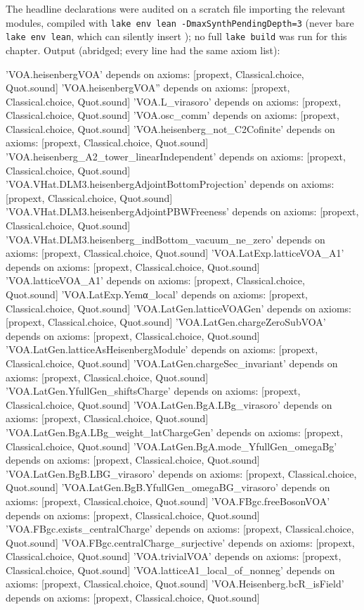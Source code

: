 The headline declarations were audited on a scratch file importing the relevant modules, compiled with
\texttt{lake env lean -DmaxSynthPendingDepth=3} (never bare \texttt{lake env lean}, which can silently insert
); no full \texttt{lake build} was run for this chapter. Output (abridged; every line had the same axiom
list):
\begin{plaincode}
'VOA.heisenbergVOA' depends on axioms: [propext, Classical.choice, Quot.sound]
'VOA.heisenbergVOA'' depends on axioms: [propext, Classical.choice, Quot.sound]
'VOA.L_virasoro' depends on axioms: [propext, Classical.choice, Quot.sound]
'VOA.osc_comm' depends on axioms: [propext, Classical.choice, Quot.sound]
'VOA.heisenberg_not_C2Cofinite' depends on axioms: [propext, Classical.choice, Quot.sound]
'VOA.heisenberg_A2_tower_linearIndependent' depends on axioms: [propext, Classical.choice, Quot.sound]
'VOA.VHat.DLM3.heisenbergAdjointBottomProjection' depends on axioms: [propext, Classical.choice, Quot.sound]
'VOA.VHat.DLM3.heisenbergAdjointPBWFreeness' depends on axioms: [propext, Classical.choice, Quot.sound]
'VOA.VHat.DLM3.heisenberg_indBottom_vacuum_ne_zero' depends on axioms: [propext, Classical.choice, Quot.sound]
'VOA.LatExp.latticeVOA_A1' depends on axioms: [propext, Classical.choice, Quot.sound]
'VOA.latticeVOA_A1' depends on axioms: [propext, Classical.choice, Quot.sound]
'VOA.LatExp.Yemα_local' depends on axioms: [propext, Classical.choice, Quot.sound]
'VOA.LatGen.latticeVOAGen' depends on axioms: [propext, Classical.choice, Quot.sound]
'VOA.LatGen.chargeZeroSubVOA' depends on axioms: [propext, Classical.choice, Quot.sound]
'VOA.LatGen.latticeAsHeisenbergModule' depends on axioms: [propext, Classical.choice, Quot.sound]
'VOA.LatGen.chargeSec_invariant' depends on axioms: [propext, Classical.choice, Quot.sound]
'VOA.LatGen.YfullGen_shiftsCharge' depends on axioms: [propext, Classical.choice, Quot.sound]
'VOA.LatGen.BgA.LBg_virasoro' depends on axioms: [propext, Classical.choice, Quot.sound]
'VOA.LatGen.BgA.LBg_weight_latChargeGen' depends on axioms: [propext, Classical.choice, Quot.sound]
'VOA.LatGen.BgA.mode_YfullGen_omegaBg' depends on axioms: [propext, Classical.choice, Quot.sound]
'VOA.LatGen.BgB.LBG_virasoro' depends on axioms: [propext, Classical.choice, Quot.sound]
'VOA.LatGen.BgB.YfullGen_omegaBG_virasoro' depends on axioms: [propext, Classical.choice, Quot.sound]
'VOA.FBgc.freeBosonVOA' depends on axioms: [propext, Classical.choice, Quot.sound]
'VOA.FBgc.exists_centralCharge' depends on axioms: [propext, Classical.choice, Quot.sound]
'VOA.FBgc.centralCharge_surjective' depends on axioms: [propext, Classical.choice, Quot.sound]
'VOA.trivialVOA' depends on axioms: [propext, Classical.choice, Quot.sound]
'VOA.latticeA1_local_of_nonneg' depends on axioms: [propext, Classical.choice, Quot.sound]
'VOA.Heisenberg.bcR_isField' depends on axioms: [propext, Classical.choice, Quot.sound]
\end{plaincode}
